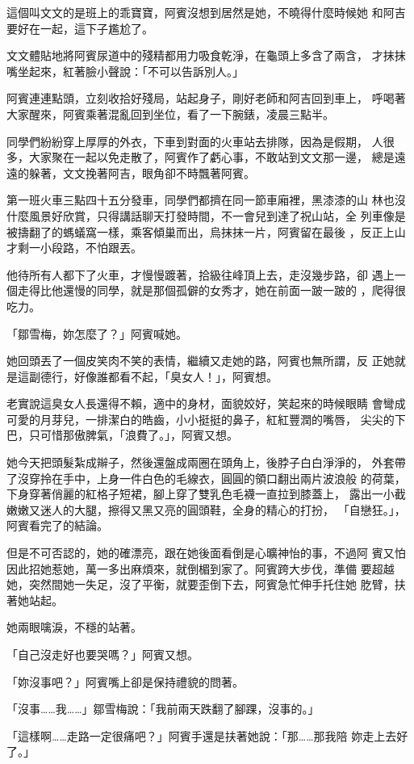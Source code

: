 這個叫文文的是班上的乖寶寶，阿賓沒想到居然是她，不曉得什麼時候她
和阿吉要好在一起，這下子尷尬了。

文文體貼地將阿賓尿道中的殘精都用力吸食乾淨，在龜頭上多含了兩含，
才抹抹嘴坐起來，紅著臉小聲說：「不可以告訴別人。」

阿賓連連點頭，立刻收拾好殘局，站起身子，剛好老師和阿吉回到車上，
呼喝著大家醒來，阿賓乘著混亂回到坐位，看了一下腕錶，凌晨三點半。

同學們紛紛穿上厚厚的外衣，下車到對面的火車站去排隊，因為是假期，
人很多，大家聚在一起以免走散了，阿賓作了虧心事，不敢站到文文那一邊，
總是遠遠的躲著，文文挽著阿吉，眼角卻不時飄著阿賓。

第一班火車三點四十五分發車，同學們都擠在同一節車廂裡，黑漆漆的山
林也沒什麼風景好欣賞，只得講話聊天打發時間，不一會兒到達了祝山站，全
列車像是被擣翻了的螞蟻窩一樣，乘客傾巢而出，烏抹抹一片，阿賓留在最後
，反正上山才剩一小段路，不怕跟丟。

他待所有人都下了火車，才慢慢踱著，拾級往峰頂上去，走沒幾步路，卻
遇上一個走得比他還慢的同學，就是那個孤僻的女秀才，她在前面一跛一跛的
，爬得很吃力。

「鄒雪梅，妳怎麼了？」阿賓喊她。

她回頭丟了一個皮笑肉不笑的表情，繼續又走她的路，阿賓也無所謂，反
正她就是這副德行，好像誰都看不起，「臭女人！」，阿賓想。

老實說這臭女人長還得不賴，適中的身材，面貌姣好，笑起來的時候眼睛
會彎成可愛的月芽兒，一排潔白的皓齒，小小挺挺的鼻子，紅紅豐潤的嘴唇，
尖尖的下巴，只可惜那傲脾氣，「浪費了。」，阿賓又想。

她今天把頭髮紮成辮子，然後還盤成兩圈在頭角上，後脖子白白淨淨的，
外套帶了沒穿拎在手中，上身一件白色的毛線衣，圓圓的領口翻出兩片波浪般
的荷葉，下身穿著俏麗的紅格子短裙，腳上穿了雙乳色毛襪一直拉到膝蓋上，
露出一小截嫩嫩又迷人的大腿，擦得又黑又亮的圓頭鞋，全身的精心的打扮，
「自戀狂。」，阿賓看完了的結論。

但是不可否認的，她的確漂亮，跟在她後面看倒是心曠神怡的事，不過阿
賓又怕因此招她惹她，萬一多出麻煩來，就倒楣到家了。阿賓跨大步伐，準備
要超越她，突然間她一失足，沒了平衡，就要歪倒下去，阿賓急忙伸手托住她
肐臂，扶著她站起。

她兩眼噙淚，不穩的站著。

「自己沒走好也要哭嗎？」阿賓又想。

「妳沒事吧？」阿賓嘴上卻是保持禮貌的問著。

「沒事……我……」鄒雪梅說：「我前兩天跌翻了腳踝，沒事的。」

「這樣啊……走路一定很痛吧？」阿賓手還是扶著她說：「那……那我陪
妳走上去好了。」


